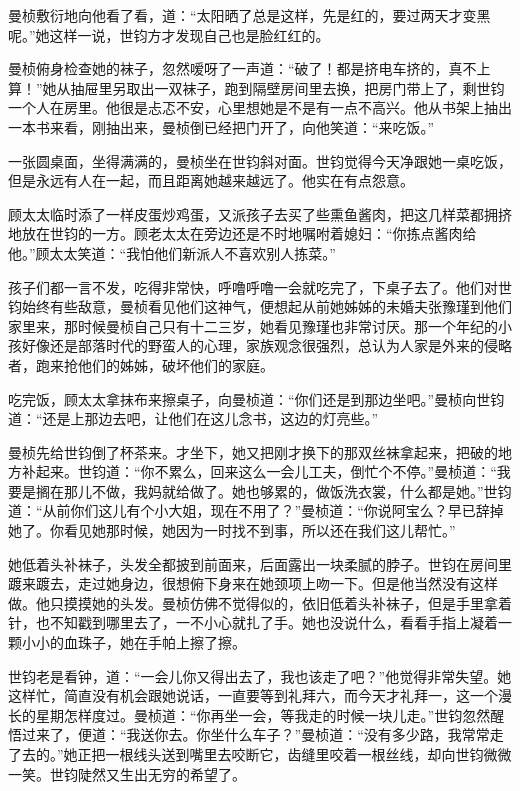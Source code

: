 \par 曼桢敷衍地向他看了看，道：“太阳晒了总是这样，先是红的，要过两天才变黑呢。”她这样一说，世钧方才发现自己也是脸红红的。
\par 曼桢俯身检查她的袜子，忽然嗳呀了一声道：“破了！都是挤电车挤的，真不上算！”她从抽屉里另取出一双袜子，跑到隔壁房间里去换，把房门带上了，剩世钧一个人在房里。他很是忐忑不安，心里想她是不是有一点不高兴。他从书架上抽出一本书来看，刚抽出来，曼桢倒已经把门开了，向他笑道：“来吃饭。”
\par 一张圆桌面，坐得满满的，曼桢坐在世钧斜对面。世钧觉得今天净跟她一桌吃饭，但是永远有人在一起，而且距离她越来越远了。他实在有点怨意。
\par 顾太太临时添了一样皮蛋炒鸡蛋，又派孩子去买了些熏鱼酱肉，把这几样菜都拥挤地放在世钧的一方。顾老太太在旁边还是不时地嘱咐着媳妇：“你拣点酱肉给他。”顾太太笑道：“我怕他们新派人不喜欢别人拣菜。”
\par 孩子们都一言不发，吃得非常快，呼噜呼噜一会就吃完了，下桌子去了。他们对世钧始终有些敌意，曼桢看见他们这神气，便想起从前她姊姊的未婚夫张豫瑾到他们家里来，那时候曼桢自己只有十二三岁，她看见豫瑾也非常讨厌。那一个年纪的小孩好像还是部落时代的野蛮人的心理，家族观念很强烈，总认为人家是外来的侵略者，跑来抢他们的姊姊，破坏他们的家庭。
\par 吃完饭，顾太太拿抹布来擦桌子，向曼桢道：“你们还是到那边坐吧。”曼桢向世钧道：“还是上那边去吧，让他们在这儿念书，这边的灯亮些。”
\par 曼桢先给世钧倒了杯茶来。才坐下，她又把刚才换下的那双丝袜拿起来，把破的地方补起来。世钧道：“你不累么，回来这么一会儿工夫，倒忙个不停。”曼桢道：“我要是搁在那儿不做，我妈就给做了。她也够累的，做饭洗衣裳，什么都是她。”世钧道：“从前你们这儿有个小大姐，现在不用了？”曼桢道：“你说阿宝么？早已辞掉她了。你看见她那时候，她因为一时找不到事，所以还在我们这儿帮忙。”
\par 她低着头补袜子，头发全都披到前面来，后面露出一块柔腻的脖子。世钧在房间里踱来踱去，走过她身边，很想俯下身来在她颈项上吻一下。但是他当然没有这样做。他只摸摸她的头发。曼桢仿佛不觉得似的，依旧低着头补袜子，但是手里拿着针，也不知戳到哪里去了，一不小心就扎了手。她也没说什么，看看手指上凝着一颗小小的血珠子，她在手帕上擦了擦。
\par 世钧老是看钟，道：“一会儿你又得出去了，我也该走了吧？”他觉得非常失望。她这样忙，简直没有机会跟她说话，一直要等到礼拜六，而今天才礼拜一，这一个漫长的星期怎样度过。曼桢道：“你再坐一会，等我走的时候一块儿走。”世钧忽然醒悟过来了，便道：“我送你去。你坐什么车子？”曼桢道：“没有多少路，我常常走了去的。”她正把一根线头送到嘴里去咬断它，齿缝里咬着一根丝线，却向世钧微微一笑。世钧陡然又生出无穷的希望了。
